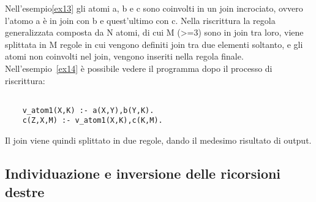 Nell'esempio\ref{ex13} gli atomi a, b e c sono coinvolti in un join incrociato, ovvero l'atomo a è in join con b e quest'ultimo con c. \newline
Nella riscrittura la regola generalizzata composta da N atomi, di cui M (>=3) sono in join tra loro, viene splittata in M regole in cui vengono definiti join tra due elementi soltanto, e gli atomi non coinvolti nel join, vengono inseriti nella regola finale. \newline
Nell'esempio~\ref{ex14} è possibile vedere il programma dopo il processo di riscrittura: 
\begin{example}\label{ex14}
	\begin{lstlisting}
	
	v_atom1(X,K) :- a(X,Y),b(Y,K). 
	c(Z,X,M) :- v_atom1(X,K),c(K,M).
	\end{lstlisting}
\end{example}
Il join viene quindi splittato in due regole, dando il medesimo risultato di output.

\subsection{Individuazione e inversione delle ricorsioni destre}

